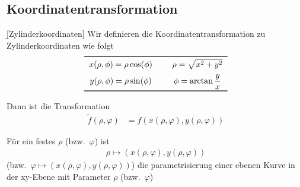 \documentclass[12pt]{article}
\begin{document}
\subsection{Koordinatentransformation}

\begin{defn}{\b{[Zylinderkoordinaten]}}
    Wir definieren die Koordinatentransformation zu Zylinderkoordinaten wie folgt
    \begin{align}
        \begin{tabular}{ccc}\toprule
            $x(\rho,\phi)=\rho\cos(\phi)$ &  & $\rho=\sqrt{x^2+y^2}$        \\[5pt]
            $y(\rho,\phi)=\rho\sin(\phi)$ &  & $\phi=\arctan{\dfrac{y}{x}}$ \\ \bottomrule
        \end{tabular}
    \end{align}

    Dann ist die Transformation
    \begin{align}
        \widetilde{f}(\rho,\varphi) & =f(x(\rho,\varphi),y(\rho,\varphi))
    \end{align}

    \begin{rmk}{}{} Für ein festes $\rho$ (bzw.\ $\varphi$) ist
        \begin{align*}
            \rho\longmapsto(x(\rho,\varphi),y(\rho,\varphi))
        \end{align*} (bzw.\ $\varphi\longmapsto(x(\rho,\varphi),y(\rho,\varphi))$)
        die parametrisierung einer ebenen Kurve in der xy-Ebene mit Parameter $\rho$ (bzw.\ $\varphi$)
    \end{rmk}


\end{defn}
\end{document}

